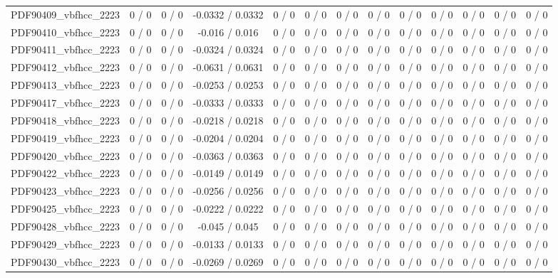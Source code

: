 \documentclass[10pt]{article}
\begin{document}
\begin{table}[htbp]
\begin{center}
\begin{tabular}{|c|c|c|c|c|c|c|c|c|c|c|c|c|}
  PDF90409_vbfhcc_2223 & 0 / 0 & 0 / 0 & -0.0332 / 0.0332 & 0 / 0 & 0 / 0 & 0 / 0 & 0 / 0 & 0 / 0 & 0 / 0 & 0 / 0 & 0 / 0 & 0 / 0 \\ 
  PDF90410_vbfhcc_2223 & 0 / 0 & 0 / 0 & -0.016 / 0.016 & 0 / 0 & 0 / 0 & 0 / 0 & 0 / 0 & 0 / 0 & 0 / 0 & 0 / 0 & 0 / 0 & 0 / 0 \\ 
  PDF90411_vbfhcc_2223 & 0 / 0 & 0 / 0 & -0.0324 / 0.0324 & 0 / 0 & 0 / 0 & 0 / 0 & 0 / 0 & 0 / 0 & 0 / 0 & 0 / 0 & 0 / 0 & 0 / 0 \\ 
  PDF90412_vbfhcc_2223 & 0 / 0 & 0 / 0 & -0.0631 / 0.0631 & 0 / 0 & 0 / 0 & 0 / 0 & 0 / 0 & 0 / 0 & 0 / 0 & 0 / 0 & 0 / 0 & 0 / 0 \\ 
  PDF90413_vbfhcc_2223 & 0 / 0 & 0 / 0 & -0.0253 / 0.0253 & 0 / 0 & 0 / 0 & 0 / 0 & 0 / 0 & 0 / 0 & 0 / 0 & 0 / 0 & 0 / 0 & 0 / 0 \\ 
  PDF90417_vbfhcc_2223 & 0 / 0 & 0 / 0 & -0.0333 / 0.0333 & 0 / 0 & 0 / 0 & 0 / 0 & 0 / 0 & 0 / 0 & 0 / 0 & 0 / 0 & 0 / 0 & 0 / 0 \\ 
  PDF90418_vbfhcc_2223 & 0 / 0 & 0 / 0 & -0.0218 / 0.0218 & 0 / 0 & 0 / 0 & 0 / 0 & 0 / 0 & 0 / 0 & 0 / 0 & 0 / 0 & 0 / 0 & 0 / 0 \\ 
  PDF90419_vbfhcc_2223 & 0 / 0 & 0 / 0 & -0.0204 / 0.0204 & 0 / 0 & 0 / 0 & 0 / 0 & 0 / 0 & 0 / 0 & 0 / 0 & 0 / 0 & 0 / 0 & 0 / 0 \\ 
  PDF90420_vbfhcc_2223 & 0 / 0 & 0 / 0 & -0.0363 / 0.0363 & 0 / 0 & 0 / 0 & 0 / 0 & 0 / 0 & 0 / 0 & 0 / 0 & 0 / 0 & 0 / 0 & 0 / 0 \\ 
  PDF90422_vbfhcc_2223 & 0 / 0 & 0 / 0 & -0.0149 / 0.0149 & 0 / 0 & 0 / 0 & 0 / 0 & 0 / 0 & 0 / 0 & 0 / 0 & 0 / 0 & 0 / 0 & 0 / 0 \\ 
  PDF90423_vbfhcc_2223 & 0 / 0 & 0 / 0 & -0.0256 / 0.0256 & 0 / 0 & 0 / 0 & 0 / 0 & 0 / 0 & 0 / 0 & 0 / 0 & 0 / 0 & 0 / 0 & 0 / 0 \\ 
  PDF90425_vbfhcc_2223 & 0 / 0 & 0 / 0 & -0.0222 / 0.0222 & 0 / 0 & 0 / 0 & 0 / 0 & 0 / 0 & 0 / 0 & 0 / 0 & 0 / 0 & 0 / 0 & 0 / 0 \\ 
  PDF90428_vbfhcc_2223 & 0 / 0 & 0 / 0 & -0.045 / 0.045 & 0 / 0 & 0 / 0 & 0 / 0 & 0 / 0 & 0 / 0 & 0 / 0 & 0 / 0 & 0 / 0 & 0 / 0 \\ 
  PDF90429_vbfhcc_2223 & 0 / 0 & 0 / 0 & -0.0133 / 0.0133 & 0 / 0 & 0 / 0 & 0 / 0 & 0 / 0 & 0 / 0 & 0 / 0 & 0 / 0 & 0 / 0 & 0 / 0 \\ 
  PDF90430_vbfhcc_2223 & 0 / 0 & 0 / 0 & -0.0269 / 0.0269 & 0 / 0 & 0 / 0 & 0 / 0 & 0 / 0 & 0 / 0 & 0 / 0 & 0 / 0 & 0 / 0 & 0 / 0 \\ 

\end{tabular}
\end{center}
\end{table}
\end{document}
